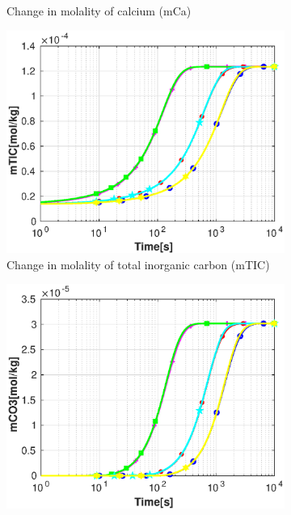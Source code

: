 \begin{figure}[!h]
\begin{subfigure}{.5\linewidth}
        \caption{Change in molality of calcium (mCa)}
        \label{fig:dvmpH6mCa}
    \end{subfigure}%
    \hfill
    \begin{subfigure}{.5\linewidth}
            \centering
        \includegraphics[width=\textwidth]{PICTURES/dvm_pH6_mTIC.eps}
        \caption{Change in molality of total inorganic carbon (mTIC)}
        \label{fig:dvmpH6mTIC}
    \end{subfigure}%
    \hfill
    \begin{subfigure}{.5\linewidth}
            \centering
        \includegraphics[width=\textwidth]{PICTURES/dvm_pH6_mCO3.eps}

\end{subfigure}
\end{figure}
